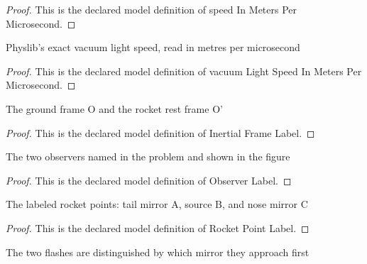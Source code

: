 \begin{proof}
  This is the declared model definition of speed In Meters Per Microsecond.
\end{proof}
\begin{definition}
  \label{def:physics:phyx-mini-0568:phyxminiproblems-problemphyxmini0568-vacuumlightspeedinmeterspermicrosecond}
  Physlib's exact vacuum light speed, read in metres per microsecond
\end{definition}
\begin{proof}
  This is the declared model definition of vacuum Light Speed In Meters Per Microsecond.
\end{proof}
\begin{definition}
  \label{def:physics:phyx-mini-0568:phyxminiproblems-problemphyxmini0568-inertialframelabel}
  The ground frame O and the rocket rest frame O'
\end{definition}
\begin{proof}
  This is the declared model definition of Inertial Frame Label.
\end{proof}
\begin{definition}
  \label{def:physics:phyx-mini-0568:phyxminiproblems-problemphyxmini0568-observerlabel}
  The two observers named in the problem and shown in the figure
\end{definition}
\begin{proof}
  This is the declared model definition of Observer Label.
\end{proof}
\begin{definition}
  \label{def:physics:phyx-mini-0568:phyxminiproblems-problemphyxmini0568-rocketpointlabel}
  The labeled rocket points: tail mirror A, source B, and nose mirror C
\end{definition}
\begin{proof}
  This is the declared model definition of Rocket Point Label.
\end{proof}
\begin{definition}
  \label{def:physics:phyx-mini-0568:phyxminiproblems-problemphyxmini0568-flashlabel}
  The two flashes are distinguished by which mirror they approach first
\end{definition}
